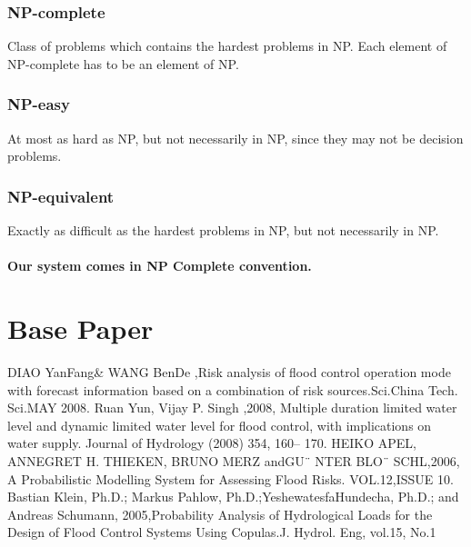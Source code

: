 \documentclass[a4paper,12pt]{report}
\begin{document}
\begin{itemize}
\begin{itemize}
\subsection {NP-complete} 
\par 
Class of problems which contains the hardest problems in NP. Each element of NP-complete has to be an element of NP.
\subsection {NP-easy} 
\par 
At most as hard as NP, but not necessarily in NP, since they may not be decision problems.

\subsection {NP-equivalent} 
\par 
Exactly as difficult as the hardest problems in NP, but not necessarily in NP.\\\\

\textbf{ Our system comes in NP Complete  convention.}

\chapter{Base Paper}




\begin{thebibliography}{SJL05}
\bibitem{} DIAO YanFang& WANG BenDe ,Risk analysis of flood control operation mode with forecast information based on a combination of risk sources.Sci.China Tech. Sci.MAY 2008.
\bibitem{}Ruan Yun, Vijay P. Singh ,2008, Multiple duration limited water level and dynamic limited water level for flood control, with implications on
water supply. Journal of Hydrology (2008) 354, 160– 170.
\bibitem{} HEIKO APEL, ANNEGRET H. THIEKEN, BRUNO MERZ andGU¨ NTER BLO¨ SCHL,2006, A Probabilistic Modelling System for
Assessing Flood Risks. VOL.12,ISSUE 10.
\bibitem{} Bastian Klein, Ph.D.; Markus Pahlow, Ph.D.;YeshewatesfaHundecha, Ph.D.; and Andreas Schumann, 2005,Probability Analysis of Hydrological
Loads for the Design of Flood Control Systems Using Copulas.J. Hydrol. Eng, vol.15, No.1
 

\end{thebibliography}
\end{itemize}
\end{itemize}
\end{document}
